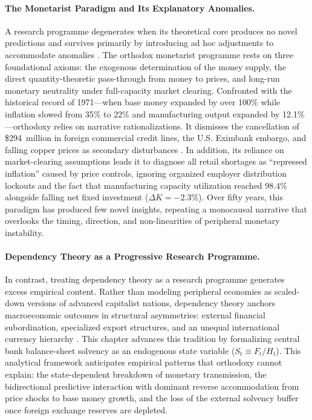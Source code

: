 \paragraph{The Monetarist Paradigm and Its Explanatory Anomalies.}
A research programme degenerates when its theoretical core produces no novel predictions and survives primarily by introducing ad hoc adjustments to accommodate anomalies \citep{Lakatos1978}. The orthodox monetarist programme rests on three foundational axioms: the exogenous determination of the money supply, the direct quantity-theoretic pass-through from money to prices, and long-run monetary neutrality under full-capacity market clearing. Confronted with the historical record of 1971---when base money expanded by over 100\% while inflation slowed from 35\% to 22\% and manufacturing output expanded by 12.1\%---orthodoxy relies on narrative rationalizations. It dismisses the cancellation of \$294~million in foreign commercial credit lines, the U.S. Eximbank embargo, and falling copper prices as secondary disturbances \citep{Edwards2024}. In addition, its reliance on market-clearing assumptions leads it to diagnose all retail shortages as ``repressed inflation'' caused by price controls, ignoring organized employer distribution lockouts and the fact that manufacturing capacity utilization reached 98.4\% alongside falling net fixed investment ($\Delta K = -2.3\%$). Over fifty years, this paradigm has produced few novel insights, repeating a monocausal narrative that overlooks the timing, direction, and non-linearities of peripheral monetary instability.

\paragraph{Dependency Theory as a Progressive Research Programme.}
In contrast, treating dependency theory as a research programme \citep{Prebisch1950,Marini1973,DosSantos1970,Kvangraven2021} generates excess empirical content. Rather than modeling peripheral economies as scaled-down versions of advanced capitalist nations, dependency theory anchors macroeconomic outcomes in structural asymmetries: external financial subordination, specialized export structures, and an unequal international currency hierarchy \citep{Vasudevan2009,Basu2022}. This chapter advances this tradition by formalizing central bank balance-sheet solvency as an endogenous state variable ($S_t \equiv F_t / H_t$). This analytical framework anticipates empirical patterns that orthodoxy cannot explain: the state-dependent breakdown of monetary transmission, the bidirectional predictive interaction with dominant reverse accommodation from price shocks to base money growth, and the loss of the external solvency buffer once foreign exchange reserves are depleted.

